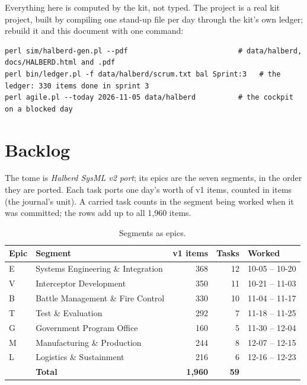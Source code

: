 \documentclass[12pt,letterpaper,oneside]{article}
\newcommand{\figfont}{\fontsize{9}{11}\selectfont}   %
\begin{document}
Everything here is computed by the kit, not typed. The project is a real kit project, built by compiling one stand-up file per day through the kit's own ledger; rebuild it and this document with one command:
\begin{Verbatim}[fontsize=\figfont,frame=lines,framesep=6pt]
perl sim/halberd-gen.pl --pdf                          # data/halberd, docs/HALBERD.html and .pdf
perl bin/ledger.pl -f data/halberd/scrum.txt bal Sprint:3   # the ledger: 330 items done in sprint 3
perl agile.pl --today 2026-11-05 data/halberd          # the cockpit on a blocked day
\end{Verbatim}
\section{Backlog}
The tome is \emph{Halberd SysML v2 port}; its epics are the seven segments, in the order they are ported. Each task ports one day's worth of v1 items, counted in items (the journal's unit). A carried task counts in the segment being worked when it was committed; the rows add up to all 1,960 items.

\begin{table}[H]\centering\figfont
\begin{tabular}{@{}l l r r l@{}}
\toprule
Epic & Segment & v1 items & Tasks & Worked \\
\midrule
E & Systems Engineering \& Integration & 368 & 12 & 10-05 -- 10-20 \\
V & Interceptor Development & 350 & 11 & 10-21 -- 11-03 \\
B & Battle Management \& Fire Control & 330 & 10 & 11-04 -- 11-17 \\
T & Test \& Evaluation & 292 & 7 & 11-18 -- 11-25 \\
G & Government Program Office & 160 & 5 & 11-30 -- 12-04 \\
M & Manufacturing \& Production & 244 & 8 & 12-07 -- 12-15 \\
L & Logistics \& Sustainment & 216 & 6 & 12-16 -- 12-23 \\
\midrule
 & \textbf{Total} & \textbf{1,960} & \textbf{59} & \\
\bottomrule
\end{tabular}
\caption{Segments as epics.}
\end{table}
\end{document}

